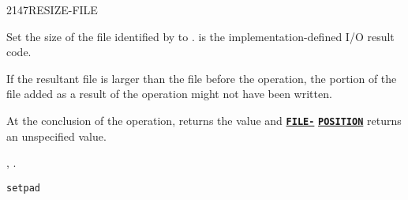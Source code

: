 \begin{worddef}{2147}{RESIZE-FILE}
\item {}

	Set the size of the file identified by  to
	.  is the implementation-defined I/O result
	code.

	If the resultant file is larger than the file before the
	operation, the portion of the file added as a result of the
	operation might not have been written.

	At the conclusion of the operation,  returns
	the value  and
	\hyperref{}{file}{FILE-POSITION}{\textbf{\texttt{FILE-}}} \linebreak
	\hyperref{}{file}{FILE-POSITION}{\textbf{\texttt{POSITION}}}
	returns an unspecified value.

\see {},
	.

	\begin{testing} %
		\texttt{setpad} \\
		 \\
		 \\
		 \\
		 \\
		 \\
		 \\
		 \\
		 \\
		 \\
		 \\
		 \\
		 \\
	\end{testing}
\end{worddef}


